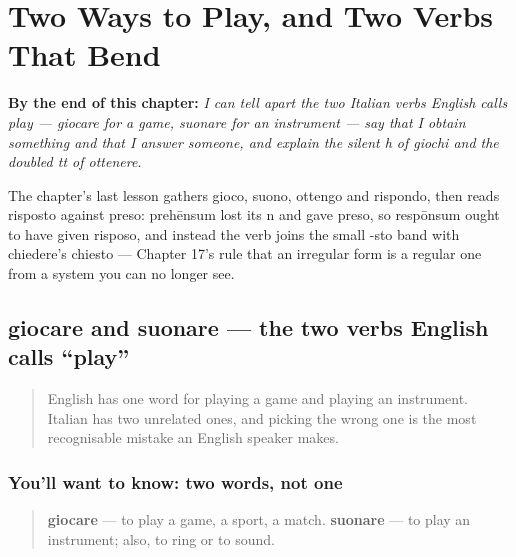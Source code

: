 
\chapter{Two Ways to Play, and Two Verbs That Bend}
\label{ch:it-play-get-answer}

\begin{chapteropening}
\textbf{By the end of this chapter:} \emph{I can tell apart the two Italian verbs English calls play — giocare for a game, suonare for an instrument — say that I obtain something and that I answer someone, and explain the silent h of giochi and the doubled tt of ottenere.}

The chapter's last lesson gathers gioco, suono, ottengo and rispondo, then reads risposto against preso: prehēnsum lost its n and gave preso, so respōnsum ought to have given risposo, and instead the verb joins the small -sto band with chiedere's chiesto — Chapter 17's rule that an irregular form is a regular one from a system you can no longer see.
\end{chapteropening}

\section[giocare, suonare]{giocare and suonare — the two verbs English calls \textquotedblleft{}play\textquotedblright{}}

\label{lesson:IT-C21-giocare}



\begin{quote}
English has one word for playing a game and playing an instrument. Italian has two unrelated ones, and picking the wrong one is the most recognisable mistake an English speaker makes.
\end{quote}

\subsection*{You'll want to know: two words, not one}
\begin{quote}
\textbf{giocare} — to play a game, a sport, a match. \textbf{suonare} — to play an instrument; also, to ring or to sound.
\end{quote}

